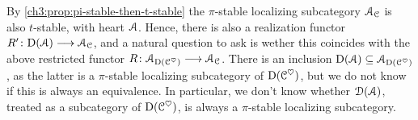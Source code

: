 \begin{remark}
    By \cref{ch3:prop:pi-stable-then-t-stable} the $\pi$-stable localizing subcategory $\EuScript{A}_{\EuScript{C}}$ is also $t$-stable, with heart $\EuScript{A}$. Hence, there is also a realization functor $R'\colon \mathrm{D}(\EuScript{A})\longrightarrow \EuScript{A}_{\EuScript{C}}$, and a natural question to ask is wether this coincides with the above restricted functor $R\colon \EuScript{A}_{\mathrm{D}(\EuScript{C}^\heartsuit)}\longrightarrow \EuScript{A}_{\EuScript{C}}$. There is an inclusion $\mathrm{D}(\EuScript{A})\subseteq \EuScript{A}_{\mathrm{D}(\EuScript{C}^\heartsuit)}$, as the latter is a $\pi$-stable localizing subcategory of $\mathrm{D}(\EuScript{C}^\heartsuit)$, but we do not know if this is always an equivalence. In particular, we don't know whether $\EuScript{D}(\EuScript{A})$, treated as a subcategory of $\mathrm{D}(\EuScript{C}^\heartsuit)$, is always a $\pi$-stable localizing subcategory. 
\end{remark}













